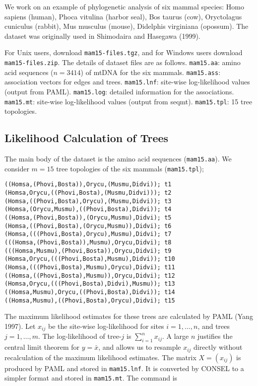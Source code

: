 \documentclass[a4paper]{amsart}
\begin{document}
We work on an example of phylogenetic analysis of six mammal species:
Homo sapiens (human), Phoca vitulina (harbor seal), Bos taurus (cow),
Oryctolagus cuniculus (rabbit), Mus musculus (mouse), Didelphis
virginiana (opossum). The dataset was originally used in Shimodaira
and Hasegawa (1999). 

For Unix users, download {\tt mam15-files.tgz}, and for Windows users
download {\tt mam15-files.zip}.  The details of dataset files are as
follows.  {\tt mam15.aa}: amino acid sequences ($n=3414$) of mtDNA for
the six mammals.  {\tt mam15.ass}: association vectors for edges and
trees.  {\tt mam15.lnf}: site-wise log-likelihood values (output from
PAML).  {\tt mam15.log}: detailed information for the associations.
{\tt mam15.mt}: site-wise log-likelihood values (output from seqmt).
{\tt mam15.tpl}: 15 tree topologies.

\subsection{Likelihood Calculation of Trees}

The main body of the dataset is the amino acid sequences ({\tt mam15.aa}).
We  consider $m=15$ tree topologies of the six mammals ({\tt mam15.tpl});
\begin{verbatim}  
((Homsa,(Phovi,Bosta)),Orycu,(Musmu,Didvi)); t1
(Homsa,Orycu,((Phovi,Bosta),(Musmu,Didvi))); t2
(Homsa,((Phovi,Bosta),Orycu),(Musmu,Didvi)); t3
(Homsa,(Orycu,Musmu),((Phovi,Bosta),Didvi)); t4
((Homsa,(Phovi,Bosta)),(Orycu,Musmu),Didvi); t5
(Homsa,((Phovi,Bosta),(Orycu,Musmu)),Didvi); t6
(Homsa,(((Phovi,Bosta),Orycu),Musmu),Didvi); t7
(((Homsa,(Phovi,Bosta)),Musmu),Orycu,Didvi); t8
(((Homsa,Musmu),(Phovi,Bosta)),Orycu,Didvi); t9
(Homsa,Orycu,(((Phovi,Bosta),Musmu),Didvi)); t10
(Homsa,(((Phovi,Bosta),Musmu),Orycu),Didvi); t11
((Homsa,((Phovi,Bosta),Musmu)),Orycu,Didvi); t12
(Homsa,Orycu,(((Phovi,Bosta),Didvi),Musmu)); t13
((Homsa,Musmu),Orycu,((Phovi,Bosta),Didvi)); t14
((Homsa,Musmu),((Phovi,Bosta),Orycu),Didvi); t15
\end{verbatim}
The maximum likelihood estimates for these trees are calculated by
PAML (Yang 1997).  Let $x_{ij}$ be the site-wise log-likelihood for
sites $i=1,\ldots,n$, and trees $j=1,\ldots,m$. The log-likelihood of
tree-$j$ is $\sum_{i=1}^n x_{ij}$. A large $n$ justifies the central
limit theorem for $y=\bar x$, and allows us to resample $x_{ij}$
directly without recalculation of the maximum likelihood
estimates. The matrix $X=(x_{ij})$ is produced by PAML and stored in
{\tt mam15.lnf}.  It is converted by CONSEL to a simpler format and
stored in {\tt mam15.mt}. The command is
\end{document}
